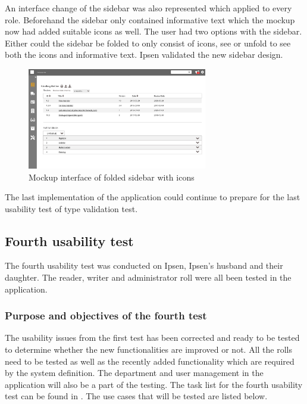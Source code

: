 An interface change of the sidebar was also represented which applied to every role.
Beforehand the sidebar only contained informative text which the mockup now had added suitable icons as well. 
The user had two options with the sidebar.
Either could the sidebar be folded to only consist of icons, see  or unfold to see both the icons and informative text. 
Ipsen validated the new sidebar design. 

\begin{figure}[H]
	\centering
		\includegraphics[width=0.7\textwidth]{billeder/ForsideFoldedSidebar.jpg}
	\caption{Mockup interface of folded sidebar with icons}\label{fig:mockupSidebarIcon}
\end{figure}

The last implementation of the application could continue to prepare for the last usability test of type validation test. 

\subsection{Fourth usability test}\label{fourthtest}
The fourth usability test was conducted on Ipsen, Ipsen's husband and their daughter. 
The reader, writer and administrator roll were all been tested in the application. 

\subsubsection*{Purpose and objectives of the fourth test}
The usability issues from the first test has been corrected and ready to be tested to determine whether the new functionalities are improved or not. 
All the rolls need to be tested as well as the recently added functionality which are required by the system definition. 
The department and user management in the application will also be a part of the testing. The task list for the fourth usability test can be found in .
The use cases that will be tested are listed below.

